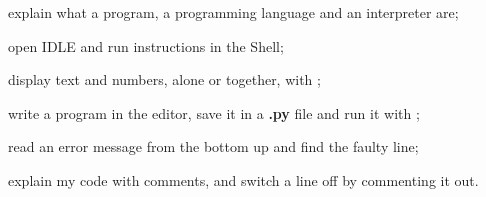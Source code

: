 \begin{jesais}
\item explain what a program, a programming language and an interpreter are;
\item open IDLE and run instructions in the Shell;
\item display text and numbers, alone or together, with ;
\item write a program in the editor, save it in a \textbf{.py} file and run it with ;
\item read an error message from the bottom up and find the faulty line;
\item explain my code with comments, and switch a line off by commenting it out.
\end{jesais}
